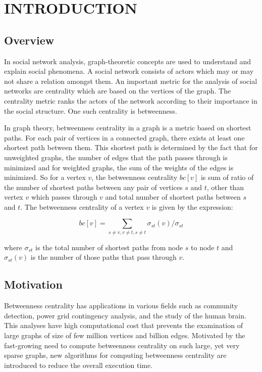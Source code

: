 \chapter{INTRODUCTION}
\label{chap:intro}
\section{Overview}

In social network analysis, graph-theoretic concepts are used to understand and explain social phenomena. A social network consists of actors which may or may not share a relation amongst them. An important metric for the analysis of social networks are centrality which are based on the vertices of the graph. The centrality metric ranks the actors of the network according to their importance in the social structure. One such centrality is betweenness. 

In graph theory, betweenness centrality in a graph is a metric based on shortest paths. For each pair of vertices in a connected graph, there exists at least one shortest path between them. This shortest path is determined by the fact that for unweighted graphs, the number of edges that the path passes through is minimized and for weighted graphs, the sum of the weights of the edges is minimized. So for a vertex $v$, the betweenness centrality $bc[v]$ is sum of ratio of the number of shortest paths between any pair of vertices $s$ and $t$, other than vertex $v$ which passes through $v$ and total number of shortest paths between $s$ and $t$.
The betweenness centrality of a vertex $v$ is given by the expression:

\[bc[v] = \sum_{s\neq v,v \neq t,s\neq t} \sigma_{st}(v) / \sigma_{st}\]

where $\sigma_{st}$ is the total number of shortest paths from node $s$ to node $t$ and $\sigma_{st}(v)$ is the number of those paths that pass through $v$.

\vspace{-1.0em}
\section{Motivation}
\vspace{-1.0em}
Betweenness centrality has applications in various fields such as community detection, power grid contingency analysis, and the study of the human brain. This analyses have high computational cost that prevents the examination of large graphs of size of few million vertices and billion edges. Motivated by the fast-growing need to compute betweenness centrality on such large, yet very sparse graphs, new algorithms for computing betweenness centrality are introduced to reduce the overall execution time. 

